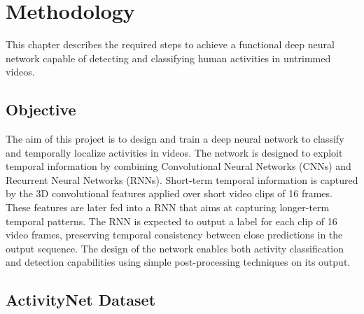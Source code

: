\chapter{Methodology}

This chapter describes the required steps to achieve a functional deep neural network capable of detecting and classifying human activities in untrimmed videos. %


\section{Objective}

The aim of this project is to design and train a deep neural network to classify and temporally localize activities in videos. The network is designed to exploit temporal information by combining Convolutional Neural Networks (CNNs) and Recurrent Neural Networks (RNNs). Short-term temporal information is captured by the 3D convolutional features applied over short video clips of 16 frames. These features are later fed into a RNN that aims at capturing longer-term temporal patterns. The RNN is expected to output a label for each clip of 16 video frames, preserving temporal consistency between close predictions in the output sequence. The design of the network enables both activity classification and detection capabilities using simple post-processing techniques on its output.



\section{ActivityNet Dataset}

